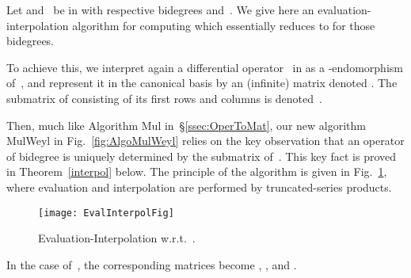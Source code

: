 \documentclass{sig-alt-full}
\begin{document}
Let  and~ be in   with respective bidegrees  and~.
We give here an evaluation-inter\-pol\-ation algorithm for computing  which essentially reduces to  for those bidegrees.

To achieve this, we interpret again a differential operator~ in  as a -endomorphism of~, and represent it in the canonical basis  by an (infinite) matrix  denoted .
The submatrix of  consisting of its first  rows and  columns is denoted~.

Then, much like Algorithm \textsf{Mul} in~\S\ref{ssec:OperToMat}, our new algorithm \textsf{MulWeyl} in Fig.~\ref{fig:AlgoMulWeyl} relies on the key observation that an operator  of bidegree  is uniquely determined by the submatrix  of~.
This key fact is proved in Theorem~\ref{interpol} below.
The principle of the algorithm is given in Fig.~\ref{fig:EvalInterp}, where evaluation and interpolation are performed by truncated-series products.
\begin{figure}[h]
\begin{center}
\texttt{[image: EvalInterpolFig]}
\end{center}
\caption{\label{fig:EvalInterp} Evaluation-Interpolation w.r.t.~.}
\end{figure}
In the case of~, the corresponding matrices become , , and .
\end{document}

